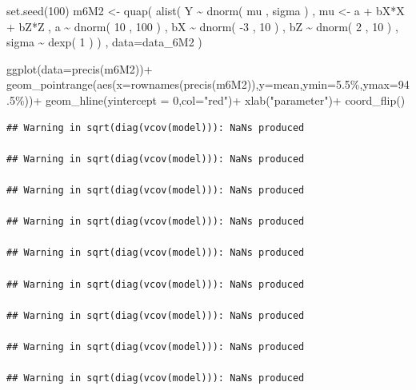 \documentclass[
]{book}
\newenvironment{Shaded}{\begin{snugshade}}{\end{snugshade}}
\newcommand{\AttributeTok}[1]{\textcolor[rgb]{0.77,0.63,0.00}{#1}}
\newcommand{\DecValTok}[1]{\textcolor[rgb]{0.00,0.00,0.81}{#1}}
\newcommand{\FunctionTok}[1]{\textcolor[rgb]{0.00,0.00,0.00}{#1}}
\newcommand{\NormalTok}[1]{#1}
\newcommand{\OtherTok}[1]{\textcolor[rgb]{0.56,0.35,0.01}{#1}}
\newcommand{\SpecialCharTok}[1]{\textcolor[rgb]{0.00,0.00,0.00}{#1}}
\newcommand{\StringTok}[1]{\textcolor[rgb]{0.31,0.60,0.02}{#1}}
\begin{document}
\begin{Shaded}
\begin{Highlighting}[]
\FunctionTok{set.seed}\NormalTok{(}\DecValTok{100}\NormalTok{)}
\NormalTok{m6M2 }\OtherTok{\textless{}{-}} \FunctionTok{quap}\NormalTok{( }
  \FunctionTok{alist}\NormalTok{(}
\NormalTok{    Y }\SpecialCharTok{\textasciitilde{}} \FunctionTok{dnorm}\NormalTok{( mu , sigma ) , }
\NormalTok{    mu }\OtherTok{\textless{}{-}}\NormalTok{ a }\SpecialCharTok{+}\NormalTok{ bX}\SpecialCharTok{*}\NormalTok{X }\SpecialCharTok{+}\NormalTok{ bZ}\SpecialCharTok{*}\NormalTok{Z , }
\NormalTok{    a }\SpecialCharTok{\textasciitilde{}} \FunctionTok{dnorm}\NormalTok{( }\DecValTok{10}\NormalTok{ , }\DecValTok{100}\NormalTok{ ) , }
\NormalTok{    bX }\SpecialCharTok{\textasciitilde{}} \FunctionTok{dnorm}\NormalTok{( }\SpecialCharTok{{-}}\DecValTok{3}\NormalTok{ , }\DecValTok{10}\NormalTok{ ) , }
\NormalTok{    bZ }\SpecialCharTok{\textasciitilde{}} \FunctionTok{dnorm}\NormalTok{( }\DecValTok{2}\NormalTok{ , }\DecValTok{10}\NormalTok{ ) , }
\NormalTok{    sigma }\SpecialCharTok{\textasciitilde{}} \FunctionTok{dexp}\NormalTok{( }\DecValTok{1}\NormalTok{ )}
\NormalTok{) , }\AttributeTok{data=}\NormalTok{data\_6M2 )}


\FunctionTok{ggplot}\NormalTok{(}\AttributeTok{data=}\FunctionTok{precis}\NormalTok{(m6M2))}\SpecialCharTok{+}
  \FunctionTok{geom\_pointrange}\NormalTok{(}\FunctionTok{aes}\NormalTok{(}\AttributeTok{x=}\FunctionTok{rownames}\NormalTok{(}\FunctionTok{precis}\NormalTok{(m6M2)),}\AttributeTok{y=}\NormalTok{mean,}\AttributeTok{ymin=}\StringTok{\textasciigrave{}}\AttributeTok{5.5\%}\StringTok{\textasciigrave{}}\NormalTok{,}\AttributeTok{ymax=}\StringTok{\textasciigrave{}}\AttributeTok{94.5\%}\StringTok{\textasciigrave{}}\NormalTok{))}\SpecialCharTok{+}
  \FunctionTok{geom\_hline}\NormalTok{(}\AttributeTok{yintercept =} \DecValTok{0}\NormalTok{,}\AttributeTok{col=}\StringTok{"red"}\NormalTok{)}\SpecialCharTok{+}
  \FunctionTok{xlab}\NormalTok{(}\StringTok{"parameter"}\NormalTok{)}\SpecialCharTok{+}
  \FunctionTok{coord\_flip}\NormalTok{()}
\end{Highlighting}
\end{Shaded}

\begin{verbatim}
## Warning in sqrt(diag(vcov(model))): NaNs produced

## Warning in sqrt(diag(vcov(model))): NaNs produced

## Warning in sqrt(diag(vcov(model))): NaNs produced

## Warning in sqrt(diag(vcov(model))): NaNs produced

## Warning in sqrt(diag(vcov(model))): NaNs produced

## Warning in sqrt(diag(vcov(model))): NaNs produced

## Warning in sqrt(diag(vcov(model))): NaNs produced

## Warning in sqrt(diag(vcov(model))): NaNs produced

## Warning in sqrt(diag(vcov(model))): NaNs produced
\end{verbatim}
\end{document}
